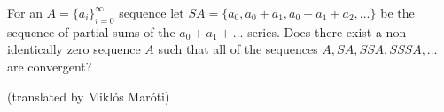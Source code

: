 For an $A=\{ a_i\}^{\infty}_{i=0}$ sequence let $SA=\{ a_0, a_0+a_1, a_0+a_1+a_2, \ldots\}$ be the sequence of partial sums of the $a_0+a_1+\ldots$ series. Does there exist a non-identically zero sequence $A$ such that all of the sequences $A, SA, SSA, SSSA, \ldots$ are convergent?

(translated by Miklós Maróti)